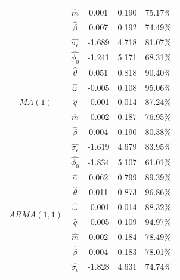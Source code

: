 \documentclass{article}
\begin{document}
\begin{table}[h]
\begin{tabular}{ccccc}
                              & $\hat{m}$                 & 0.001 & 0.190 & 75.17\% \\
                              & $\hat{\beta}$             & 0.007 & 0.192 & 74.49\% \\
                              & $\hat{\sigma_{\epsilon}}$ &-1.689 & 4.718 & 81.07\% \\
\hline
\multirow{7}{*}{$MA(1)$}      & $\hat{\phi_0}$            &-1.241 & 5.171 & 68.31\% \\
                              & $\hat{\theta}$            & 0.051 & 0.818 & 90.40\% \\
                              & $\hat{\omega}$            &-0.005 & 0.108 & 95.06\% \\
                              & $\hat{q}$                 &-0.001 & 0.014 & 87.24\% \\
                              & $\hat{m}$                 &-0.002 & 0.187 & 76.95\% \\
                              & $\hat{\beta}$             & 0.004 & 0.190 & 80.38\% \\
                              & $\hat{\sigma_{\epsilon}}$ &-1.619 & 4.679 & 83.95\% \\
\hline
\multirow{8}{*}{$ARMA(1, 1)$} & $\hat{\phi_0}$            & -1.834 & 5.107 & 61.01\% \\
                              & $\hat{\alpha}$            & 0.062  & 0.799 & 89.39\% \\
                              & $\hat{\theta}$            & 0.011  & 0.873 & 96.86\% \\
                              & $\hat{\omega}$            & -0.001 & 0.014 & 88.32\% \\
                              & $\hat{q}$                 & -0.005 & 0.109 & 94.97\% \\
                              & $\hat{m}$                 & 0.002  & 0.184 & 78.49\% \\
                              & $\hat{\beta}$             & 0.004  & 0.183 & 78.01\% \\
                              & $\hat{\sigma_{\epsilon}}$ & -1.828 & 4.631 & 74.74\% \\
\bottomrule
\end{tabular}
\end{table}
\end{document}
